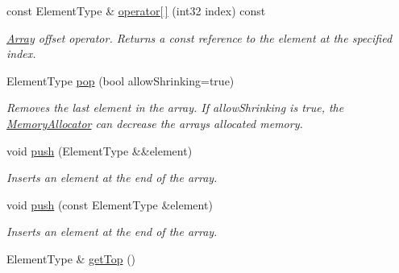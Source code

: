 \begin{DoxyCompactItemize}
\mbox{\label{class_arcana_1_1_array_ac04751f78e6846fa55a633e3acc96e23}} 
const Element\+Type \& \mbox{\hyperlink{class_arcana_1_1_array_ac04751f78e6846fa55a633e3acc96e23}{operator\mbox{[}$\,$\mbox{]}}} (int32 index) const
\begin{DoxyCompactList}\small\item\em \mbox{\hyperlink{class_arcana_1_1_array}{Array}} offset operator. Returns a const reference to the element at the specified index. \end{DoxyCompactList}\item 
\mbox{\label{class_arcana_1_1_array_a952855bbeb0b73ee905e088e5bd02082}} 
Element\+Type \mbox{\hyperlink{class_arcana_1_1_array_a952855bbeb0b73ee905e088e5bd02082}{pop}} (bool allow\+Shrinking=true)
\begin{DoxyCompactList}\small\item\em Removes the last element in the array. If \textquotesingle{}allow\+Shrinking\textquotesingle{} is true, the \mbox{\hyperlink{class_arcana_1_1_memory_allocator}{Memory\+Allocator}} can decrease the array\textquotesingle{}s allocated memory. \end{DoxyCompactList}\item 
\mbox{\label{class_arcana_1_1_array_a0d1872dfb564625c1eb451112b14023e}} 
void \mbox{\hyperlink{class_arcana_1_1_array_a0d1872dfb564625c1eb451112b14023e}{push}} (Element\+Type \&\&element)
\begin{DoxyCompactList}\small\item\em Inserts an element at the end of the array. \end{DoxyCompactList}\item 
\mbox{\label{class_arcana_1_1_array_aa1c62a1fcad8d75472c0b888595f4135}} 
void \mbox{\hyperlink{class_arcana_1_1_array_aa1c62a1fcad8d75472c0b888595f4135}{push}} (const Element\+Type \&element)
\begin{DoxyCompactList}\small\item\em Inserts an element at the end of the array. \end{DoxyCompactList}\item 
\mbox{\label{class_arcana_1_1_array_a554e8d788b2780646b05ed0befd499f3}} 
Element\+Type \& \mbox{\hyperlink{class_arcana_1_1_array_a554e8d788b2780646b05ed0befd499f3}{get\+Top}} ()

\end{DoxyCompactItemize}
